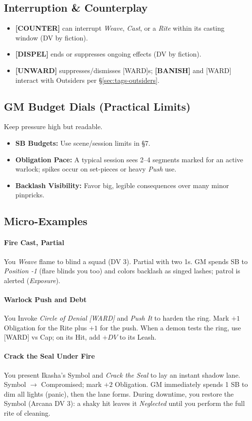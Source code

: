 \subsection{Interruption \& Counterplay}
\begin{itemize}
  \item \textbf{[COUNTER]} can interrupt \emph{Weave}, \emph{Cast}, or a \emph{Rite} within its casting window (DV by fiction).
  \item \textbf{[DISPEL]} ends or suppresses ongoing effects (DV by fiction).
  \item \textbf{[UNWARD]} suppresses/dismisses [WARD]s; \textbf{[BANISH]} and [WARD] interact with Outsiders per \S\ref{sec:tags-outsiders}.
\end{itemize}

\subsection{GM Budget Dials (Practical Limits)}
Keep pressure high but readable.
\begin{itemize}
  \item \textbf{SB Budgets:} Use scene/session limits in \S7.
  \item \textbf{Obligation Pace:} A typical session sees 2--4 segments marked for an active warlock; spikes occur on set-pieces or heavy \emph{Push} use.
  \item \textbf{Backlash Visibility:} Favor big, legible consequences over many minor pinpricks.
\end{itemize}

\subsection{Micro-Examples}
\paragraph{Fire Cast, Partial}
You \emph{Weave} flame to blind a squad (DV 3). Partial with two 1s. GM spends SB to \emph{Position -1} (flare blinds you too) and colors backlash as singed lashes; patrol is alerted (\emph{Exposure}).

\paragraph{Warlock Push and Debt}
You Invoke \emph{Circle of Denial [WARD]} and \emph{Push It} to harden the ring. Mark $+1$ Obligation for the Rite plus $+1$ for the push. When a demon tests the ring, use [WARD] vs Cap; on its Hit, add $+DV$ to its Leash.

\paragraph{Crack the Seal Under Fire}
You present Ikasha’s Symbol and \emph{Crack the Seal} to lay an instant shadow lane. Symbol $\rightarrow$ Compromised; mark $+2$ Obligation. GM immediately spends 1 SB to dim all lights (panic), then the lane forms. During downtime, you restore the Symbol (Arcana DV 3): a shaky hit leaves it \emph{Neglected} until you perform the full rite of cleaning.
